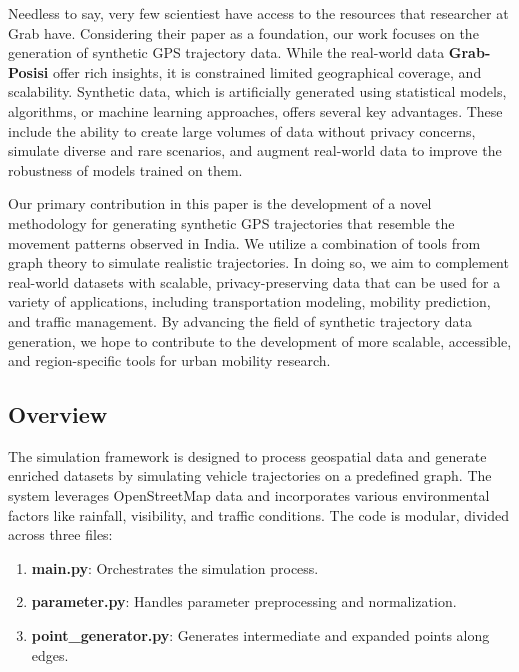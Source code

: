 \documentclass[sigplan,screen]{acmart}
\begin{document}
Needless to say, very few scientiest have access to the resources
that researcher at Grab have.
Considering their paper as a foundation, our work focuses on the generation of synthetic GPS trajectory data. 
While the real-world data \textbf{Grab-Posisi} offer rich insights, it is
constrained limited geographical coverage, and scalability. 
Synthetic data, which is artificially generated using statistical models, algorithms, or machine learning approaches, offers several key advantages. These include the ability to create large volumes of data without privacy concerns, simulate diverse and rare scenarios, and augment real-world data to improve the robustness of models trained on them.

Our primary contribution in this paper is the development of a novel methodology for generating synthetic GPS trajectories that resemble the movement patterns observed in India. 
We utilize a combination of tools from graph theory to 
simulate realistic trajectories. 
In doing so, we aim to complement real-world datasets with scalable, privacy-preserving data that can be used for a variety of applications, including transportation modeling, mobility prediction, and traffic management.
By advancing the field of synthetic trajectory data generation, we hope to contribute to the development of more scalable, accessible, and region-specific tools for urban mobility research.





\subsection{Overview}
The simulation framework is designed to process geospatial data and generate enriched datasets by simulating vehicle trajectories on a predefined graph.
The system leverages OpenStreetMap data and incorporates various environmental factors like rainfall, visibility, and traffic conditions. The code is modular, divided across three files:

\begin{enumerate}
    \item \textbf{main.py}: Orchestrates the simulation process.
    \item \textbf{parameter.py}: Handles parameter preprocessing and normalization.
    \item \textbf{point\_generator.py}: Generates intermediate and expanded points along edges.
\end{enumerate}
\end{document}
